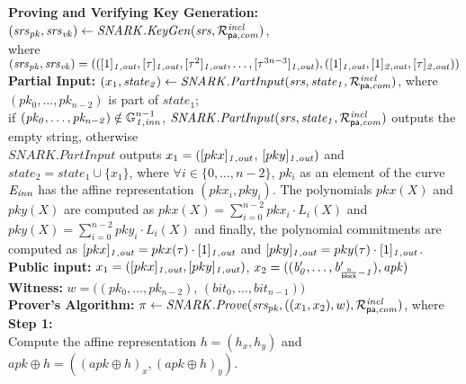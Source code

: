 \noindent \textbf{Proving and Verifying Key Generation:} $(\mathit{srs}_{\mathit{pk}}, \mathit{srs}_{\mathit{vk}}) \leftarrow \mathit{SNARK.KeyGen}(\mathit{srs}, \mathcal{R}^{\mathit{incl}}_{\mathsf{pa},\mathit{com}})$, \\
where $(\mathit{srs}_{\mathit{pk}}, \mathit{srs}_{\mathit{vk}}) = 
(([1]_{\mathit{1,out}}, [\tau]_{\mathit{1,out}}, [\tau^2]_{\mathit{1,out}}, \ldots, [\tau^{3n-3}]_{\mathit{1,out}}), ([1]_{\mathit{1,out}}, [1]_{\mathit{2,out}}, [\tau]_{\mathit{2,out}}))$ \\

\noindent \textbf{Partial Input:} $(x_1, \mathit{state_2}) \leftarrow \mathit{SNARK.PartInput}(\mathit{srs}, \mathit{state_1}, \mathcal{R}^{\mathit{incl}}_{\mathsf{pa},\mathit{com}})$, 
where $(\mathit{pk_0}, \ldots, \mathit{pk_{n-2}})$ is part of $\mathit{state_1}$; \\ 
if $(\mathit{pk_0}, \ldots, \mathit{pk_{n-2}}) \notin \mathbb{G}_{\mathit{1,inn}}^{n-1}$, $\mathit{SNARK.PartInput}(\mathit{srs}, \mathit{state_1}, \mathcal{R}^{\mathit{incl}}_{\mathsf{pa},\mathit{com}})$ outputs the empty string, otherwise \\
$\mathit{SNARK.PartInput}$ outputs $x_1 = ([pkx]_{\mathit{1,out}}$, $[pky]_{\mathit{1,out}})$ and $\mathit{state_2} = \mathit{state_1} \cup \{ x_1\}$, where $\forall i \in \{0, \ldots, n-2\}$, $\mathit{pk_i}$ as an element of the curve $\mathit{E}_{\mathit{inn}}$ 
has the affine representation $(\mathit{pkx_i}, \mathit{pky_i})$. The polynomials $pkx(X)$ and $pky(X)$ are computed as $pkx(X) = \sum_{i=0}^{n-2} \mathit{pkx_i} \cdot L_i(X)$ 
and $pky(X) = \sum_{i=0}^{n-2} \mathit{pky_i} \cdot L_i(X)$ and finally, the polynomial commitments are computed as 
$[pkx]_{\mathit{1,out}} = pkx(\tau) \cdot [1]_{\mathit{1,out}}$ and $[pky]_{\mathit{1,out}} = pky(\tau) \cdot [1]_{\mathit{1,out}}$.\\

\noindent \textbf{Public input:} $x_1 = ([pkx]_{\mathit{1,out}}, [pky]_{\mathit{1,out}})$, $x_2 = ((\mathit{b'_{0}}, \ldots, \mathit{b'_{\frac{n}{\mathsf{block}}-1}}), \mathit{apk})$\\

\noindent \textbf{Witness:}
$w = ((\mathit{pk_0}, \ldots, \mathit{pk_{n-2}})$, $(\mathit{bit}_0, \ldots, \mathit{bit_{n-1}}))$ \\

\noindent \textbf{Prover's Algorithm:} $ \pi \leftarrow \mathit{SNARK.Prove}(\mathit{srs_{pk}}, ((x_1, x_2), w), \mathcal{R}^{\mathit{incl}}_{\mathsf{pa},\mathit{com}})$, where\\

\noindent \textbf{Step 1:} \\
\noindent Compute the affine representation $h = (h_x, h_y)$ and  $apk \oplus h = ((apk \oplus h)_{x}, (apk \oplus h)_{y})$. \\


